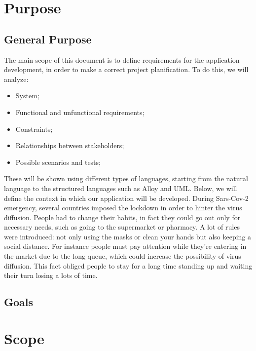 \section{Purpose}
\subsection{General Purpose}

The main scope of this document is to define requirements for the application development, in order to make a correct project planification. 
To do this, we will analyze:

\begin{itemize}
\item System;
\item Functional and unfunctional requirements;
\item Constraints;
\item Relationships between stakeholders;
\item Possible scenarios and tests;
\end{itemize}
\medskip
These will be shown using different types of languages, starting from the natural language to the structured languages such as Alloy and UML.
Below, we will define the context in which our application will be developed.
During Sars-Cov-2 emergency, several countries imposed the lockdown in order to hinter the virus diffusion.
People had to change their habits, in fact they could go out only for necessary needs, such as going to the supermarket or pharmacy.
A lot of rules were introduced: not only using the masks or clean your hands but also keeping a social distance.
For instance people must pay attention while they're entering in the market due to the long queue, which could increase the possibility of virus diffusion.
This fact obliged people to stay for a long time standing up and waiting their turn losing a lots of time. 




\subsection{Goals}

\section{Scope}

